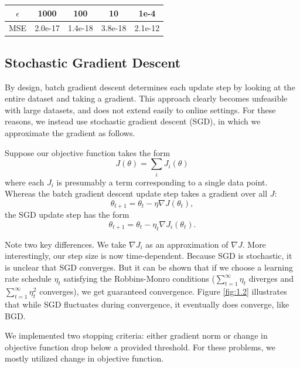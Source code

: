 \documentclass{article}
\begin{document}
\begin{multicols}{2}

\begin{center}
\begin{tabular}{|c|c|c|c|c|}\hline
\label{tab:1.2}
$\epsilon$ & 1000 & 100 & 10 & 1e-4 \\ \hline
MSE & 2.0e-17 & 1.4e-18 & 3.8e-18 & 2.1e-12 \\
 \hline
\end{tabular}
\end{center}

\subsection{Stochastic Gradient Descent}

By design, batch gradient descent determines each update step by looking at the entire dataset and taking a gradient. This approach clearly becomes unfeasible with large datasets, and does not extend easily to online settings. For these reasons, we instead use stochastic gradient descent (SGD), in which we approximate the gradient as follows.

Suppose our objective function takes the form
\begin{equation}
J(\theta) = \sum_i J_i(\theta)
\end{equation}
where each $J_i$ is presumably a term corresponding to a single data point. Whereas the batch gradient descent update step takes a gradient over all $J$:
\begin{equation}
\theta_{t+1} = \theta_t - \eta \nabla J(\theta_t),
\end{equation}
the SGD update step has the form
\begin{equation} \theta_{t+1} = \theta_t - \eta_t \nabla J_i(\theta_t). \end{equation}

Note two key differences. We take $\nabla J_i$ as an approximation of $\nabla J$. More interestingly, our step size is now time-dependent. Because SGD is stochastic, it is unclear that SGD converges. But it can be shown that if we choose a learning rate schedule $\eta_t$ satisfying the Robbins-Monro conditions ($\sum_{t=1}^\infty \eta_t$ diverges and $\sum_{t=1}^\infty \eta_t^2$ converges), we get guaranteed convergence. Figure \ref{fig:1.2} illustrates that while SGD fluctuates during convergence, it eventually does converge, like BGD.

We implemented two stopping criteria: either gradient norm or change in objective function drop below a provided threshold. For these problems, we mostly utilized change in objective function.




\end{multicols}
\end{document}
